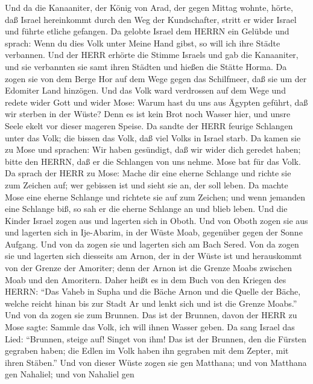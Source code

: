  Und da die Kanaaniter, der König von Arad, der gegen Mittag
wohnte, hörte, daß Israel hereinkommt durch den Weg der Kundschafter,
stritt er wider Israel und führte etliche gefangen.  Da
gelobte Israel dem HERRN ein Gelübde und sprach: Wenn du dies Volk unter
Meine Hand gibst, so will ich ihre Städte verbannen.  Und
der HERR erhörte die Stimme Israels und gab die Kanaaniter, und sie
verbannten sie samt ihren Städten und hießen die Stätte Horma.
 Da zogen sie von dem Berge Hor auf dem Wege gegen das
Schilfmeer, daß sie um der Edomiter Land hinzögen. Und das Volk ward
verdrossen auf dem Wege  und redete wider Gott und wider
Mose: Warum hast du uns aus Ägypten geführt, daß wir sterben in der
Wüste? Denn es ist kein Brot noch Wasser hier, und unsre Seele ekelt vor
dieser mageren Speise.  Da sandte der HERR feurige Schlangen
unter das Volk; die bissen das Volk, daß viel Volks in Israel starb.
 Da kamen sie zu Mose und sprachen: Wir haben gesündigt, daß
wir wider dich geredet haben; bitte den HERRN, daß er die Schlangen von
uns nehme. Mose bat für das Volk.  Da sprach der HERR zu
Mose: Mache dir eine eherne Schlange und richte sie zum Zeichen auf; wer
gebissen ist und sieht sie an, der soll leben.  Da machte
Mose eine eherne Schlange und richtete sie auf zum Zeichen; und wenn
jemanden eine Schlange biß, so sah er die eherne Schlange an und blieb
leben.  Und die Kinder Israel zogen aus und lagerten sich
in Oboth.  Und von Oboth zogen sie aus und lagerten sich in
Ije-Abarim, in der Wüste Moab, gegenüber gegen der Sonne Aufgang.
 Und von da zogen sie und lagerten sich am Bach Sered.
 Von da zogen sie und lagerten sich diesseits am Arnon, der
in der Wüste ist und herauskommt von der Grenze der Amoriter; denn der
Arnon ist die Grenze Moabs zwischen Moab und den Amoritern.
 Daher heißt es in dem Buch von den Kriegen des HERRN:
``Das Vaheb in Supha und die Bäche Arnon  und die Quelle
der Bäche, welche reicht hinan bis zur Stadt Ar und lenkt sich und ist
die Grenze Moabs.''  Und von da zogen sie zum Brunnen. Das
ist der Brunnen, davon der HERR zu Mose sagte: Sammle das Volk, ich will
ihnen Wasser geben.  Da sang Israel das Lied: ``Brunnen,
steige auf! Singet von ihm!  Das ist der Brunnen, den die
Fürsten gegraben haben; die Edlen im Volk haben ihn gegraben mit dem
Zepter, mit ihren Stäben.'' Und von dieser Wüste zogen sie gen Matthana;
 und von Matthana gen Nahaliel; und von Nahaliel gen
